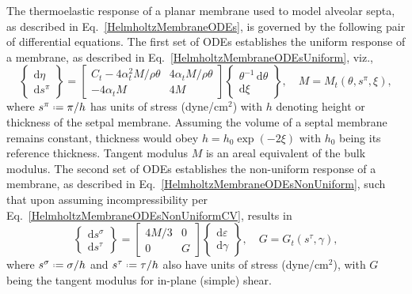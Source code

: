The thermo\-elastic response of a planar membrane used to model alveolar septa, as described in Eq.~\ref{HelmholtzMembraneODEs}, is governed by the following pair of differential equations.  The first set of ODEs establishes the uniform response of a membrane, as described in Eq.~\ref{HelmholtzMembraneODEsUniform}, viz.,
\begin{displaymath}
    \left\{ \begin{matrix}
    \mathrm{d} \eta \\ \mathrm{d} s^{\pi}
    \end{matrix} \right\} = \begin{bmatrix}
    C_t - 4 \alpha^2_t M / \rho \theta & 
    4 \alpha_t M / \rho \theta \\
    -4 \alpha_t M & 4 M
    \end{bmatrix} \left\{ \begin{matrix}
    \theta^{-1} \, \mathrm{d} \theta \\ \mathrm{d} \xi
    \end{matrix} \right\} , \quad
    M = M_t ( \theta , s^{\pi} , \xi ),
\end{displaymath}
where $s^{\pi} \defeq \pi / h$ has units of stress (dyne/$\text{cm}^2$) with $h$ denoting height or thickness of the setpal membrane.  Assuming the volume of a septal membrane remains constant, thickness would obey $h = h_0 \exp ( -2 \xi )$ with $h_0$ being its reference thickness.  Tangent modulus $M$ is an areal equivalent of the bulk modulus.  The second set of ODEs establishes the non-uniform response of a membrane, as described in Eq.~\ref{HelmholtzMembraneODEsNonUniform}, such that upon assuming incompressibility per Eq.~\ref{HelmholtzMembraneODEsNonUniformCV}, results in
\begin{displaymath}
    \left\{ \begin{matrix}
    \mathrm{d} s^{\sigma} \\ \mathrm{d} s^{\tau}
    \end{matrix} \right\} = \begin{bmatrix}
    4M/3 & 0 \\
    0 & G
    \end{bmatrix} \left\{ \begin{matrix}
    \mathrm{d} \varepsilon \\ \mathrm{d} \gamma
    \end{matrix} \right\} , \quad
        G = G_t ( s^{\tau} , \gamma ),
\end{displaymath}
where $s^{\sigma} \defeq \sigma / h$ and $s^{\tau} \defeq \tau / h$ also have units of stress (dyne/$\text{cm}^2$), with $G$ being the tangent modulus for in-plane (simple) shear. 

